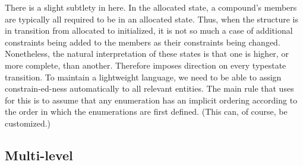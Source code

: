 \documentclass[10pt]{amsart}
\begin{document}
There is a slight subtlety in here.  In the allocated state, a
compound's members are typically all required to be in an allocated
state.  Thus, when the structure is in transition from allocated to
initialized, it is not so much a case of additional constraints being
added to the members as their constraints being changed.  Nonetheless,
the natural interpretation of these states is that one is higher, or
more complete, than another.  Therefore \Utop imposes direction on
every typestate transition.  To maintain a lightweight language, we
need to be able to assign constrain-ed-ness automatically to all
relevant entities.  The main rule that \Utop uses for this is to
assume that any enumeration has an implicit ordering according to the
order in which the enumerations are first defined.  (This can, of
course, be customized.)

\subsection{Multi-level}


\end{document}
